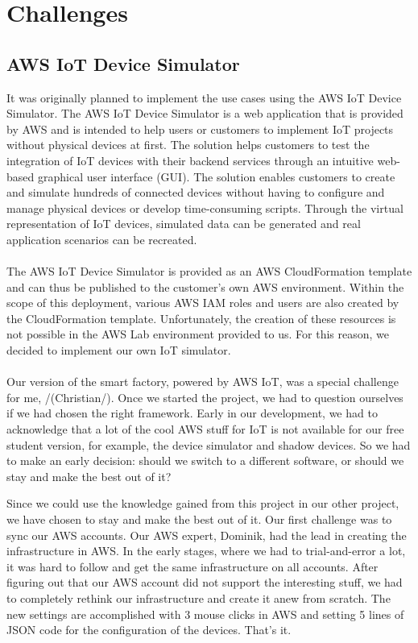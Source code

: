 \chapter{Challenges}

\section{AWS IoT Device Simulator}

It was originally planned to implement the use cases using the AWS IoT Device Simulator. The AWS IoT Device Simulator is a web application that is provided by AWS and is intended to help users or customers to implement IoT projects without physical devices at first. 
The solution helps customers to test the integration of IoT devices with their backend services through an intuitive web-based graphical user interface (GUI). The solution enables customers to create and simulate hundreds of connected devices without having to configure and manage physical devices or develop time-consuming scripts.
Through the virtual representation of IoT devices, simulated data can be generated and real application scenarios can be recreated.
\\
\\
The AWS IoT Device Simulator is provided as an AWS CloudFormation template and can thus be published to the customer's own AWS environment.
 Within the scope of this deployment, various AWS IAM roles and users are also created by the CloudFormation template. Unfortunately, the creation of these resources is not possible in the AWS Lab environment provided to us. For this reason, we decided to implement our own IoT simulator.
\\
\\
Our version of the smart factory, powered by AWS IoT, was a special challenge for me, /(Christian/).
Once we started the project, we had to question ourselves if we had chosen the right framework.
Early in our development, we had to acknowledge that a lot of the cool AWS stuff for IoT is not available for our free student version, for example, the device simulator and shadow devices.
So we had to make an early decision: should we switch to a different software, or should we stay and make the best out of it?

Since we could use the knowledge gained from this project in our other project, we have chosen to stay and make the best out of it. 
Our first challenge was to sync our AWS accounts. 
Our AWS expert, Dominik, had the lead in creating the infrastructure in AWS. 
In the early stages, where we had to trial-and-error a lot, it was hard to follow and get the same infrastructure on all accounts. 
After figuring out that our AWS account did not support the interesting stuff, we had to completely rethink our infrastructure and create it anew from scratch. 
The new settings are accomplished with 3 mouse clicks in AWS and setting 5 lines of JSON code for the configuration of the devices. That's it.

